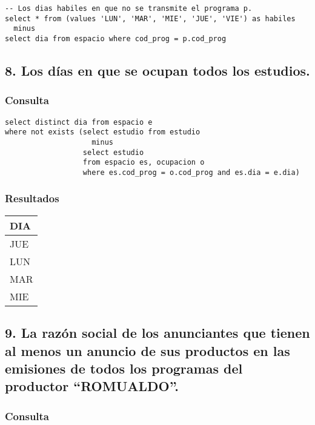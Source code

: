 \begin{lstlisting} 
-- Los dias habiles en que no se transmite el programa p.
select * from (values 'LUN', 'MAR', 'MIE', 'JUE', 'VIE') as habiles
  minus
select dia from espacio where cod_prog = p.cod_prog
\end{lstlisting}

\subsection*{8. \normalsize{Los d\'ias en que se ocupan todos los estudios.}}

\subsubsection*{Consulta}
\begin{lstlisting} 
select distinct dia from espacio e
where not exists (select estudio from estudio
                    minus
                  select estudio 
                  from espacio es, ocupacion o
                  where es.cod_prog = o.cod_prog and es.dia = e.dia)
\end{lstlisting}

\subsubsection*{Resultados}
\begin{tabular}{|l|}
  \hline
    \bf{DIA} \\ 
  \hline
    JUE \\
    LUN \\
    MAR \\
    MIE \\
  \hline
\end{tabular} 

\subsection*{9. \normalsize{La raz\'on social de los anunciantes que tienen al menos un anuncio de sus productos en las emisiones de todos los programas del productor ``ROMUALDO''.}}

\subsubsection*{Consulta}
\begin{lstlisting} 

\end{lstlisting}

